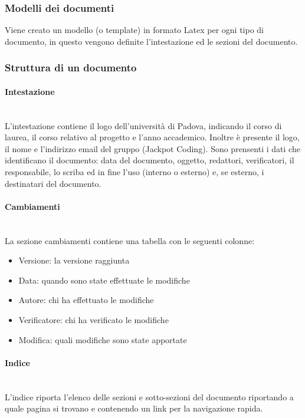 \documentclass{article}
\begin{document}
\subsubsection{Modelli dei documenti}
Viene creato un modello (o template) in formato Latex per ogni tipo di documento, in questo vengono definite l'intestazione ed le sezioni del documento.

\subsubsection{Struttura di un documento}

\paragraph{Intestazione}~\\
L'intestazione contiene il logo dell'università di Padova, indicando il corso di laurea, il corso relativo al progetto e l'anno accademico. Inoltre è presente il logo, il nome e l'indirizzo email del gruppo (Jackpot Coding).
Sono prensenti i dati che identificano il documento: data del documento, oggetto, redattori, verificatori, il responsabile, lo scriba ed in fine l'uso (interno o esterno) e, se esterno, i destinatari del documento.

\paragraph{Cambiamenti}~\\
La sezione cambiamenti contiene una tabella con le seguenti colonne:
\begin{itemize}
    \item Versione: la versione raggiunta
    \item Data: quando sono state effettuate le modifiche
    \item Autore: chi ha effettuato le modifiche
    \item Verificatore: chi ha verificato le modifiche
    \item Modifica: quali modifiche sono state apportate
\end{itemize}

\paragraph{Indice}~\\
L'indice riporta l'elenco delle sezioni e sotto-sezioni del documento riportando a quale pagina si trovano e contenendo un link per la navigazione rapida.
\end{document}

